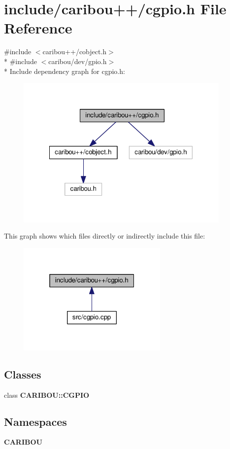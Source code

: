 \section{include/caribou++/cgpio.h File Reference}
\label{cgpio_8h}
{\ttfamily \#include $<$caribou++/cobject.\-h$>$}\\*
{\ttfamily \#include $<$caribou/dev/gpio.\-h$>$}\\*
Include dependency graph for cgpio.\-h\-:\nopagebreak
\begin{figure}[H]
\begin{center}
\leavevmode
\includegraphics[width=297pt]{cgpio_8h__incl}
\end{center}
\end{figure}
This graph shows which files directly or indirectly include this file\-:\nopagebreak
\begin{figure}[H]
\begin{center}
\leavevmode
\includegraphics[width=208pt]{cgpio_8h__dep__incl}
\end{center}
\end{figure}
\subsection*{Classes}
\begin{DoxyCompactItemize}
\item 
class {\bf C\-A\-R\-I\-B\-O\-U\-::\-C\-G\-P\-I\-O}
\end{DoxyCompactItemize}
\subsection*{Namespaces}
\begin{DoxyCompactItemize}
\item 
{\bf C\-A\-R\-I\-B\-O\-U}
\end{DoxyCompactItemize}
